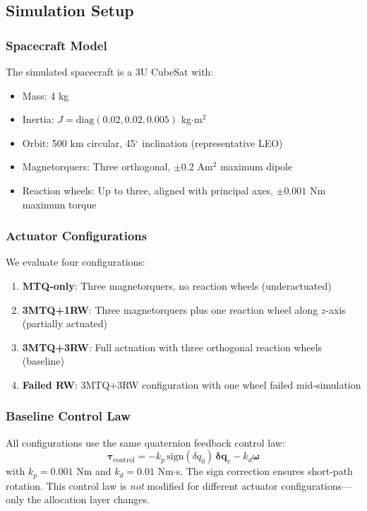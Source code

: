 \documentclass[conference]{IEEEtran}
\begin{document}
\subsection{Simulation Setup}

\subsubsection{Spacecraft Model}
The simulated spacecraft is a 3U CubeSat with:
\begin{itemize}
    \item Mass: 4 kg
    \item Inertia: $J = \text{diag}(0.02, 0.02, 0.005)$ kg$\cdot$m$^2$
    \item Orbit: 500 km circular, 45$^\circ$ inclination (representative LEO)
    \item Magnetorquers: Three orthogonal, $\pm 0.2$ Am$^2$ maximum dipole
    \item Reaction wheels: Up to three, aligned with principal axes, $\pm 0.001$ Nm maximum torque
\end{itemize}

\subsubsection{Actuator Configurations}
We evaluate four configurations:
\begin{enumerate}
    \item \textbf{MTQ-only}: Three magnetorquers, no reaction wheels (underactuated)
    \item \textbf{3MTQ+1RW}: Three magnetorquers plus one reaction wheel along $z$-axis (partially actuated)
    \item \textbf{3MTQ+3RW}: Full actuation with three orthogonal reaction wheels (baseline)
    \item \textbf{Failed RW}: 3MTQ+3RW configuration with one wheel failed mid-simulation
\end{enumerate}

\subsubsection{Baseline Control Law}
All configurations use the same quaternion feedback control law:
\begin{equation}
\boldsymbol{\tau}_{\text{control}} = -k_p \, \text{sign}(\delta q_0) \, \mathbf{\delta q}_v - k_d \boldsymbol{\omega}
\end{equation}
with $k_p = 0.001$ Nm and $k_d = 0.01$ Nm$\cdot$s. The sign correction ensures short-path rotation. This control law is \emph{not} modified for different actuator configurations---only the allocation layer changes.
\end{document}
